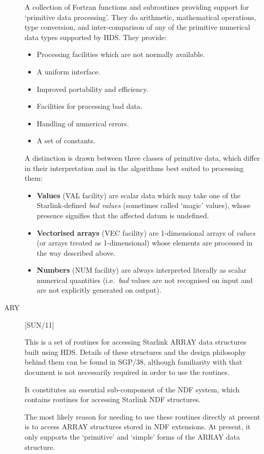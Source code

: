 \begin{description}
A collection of Fortran functions and subroutines providing support for
`primitive data processing'. 
They do arithmetic, mathematical operations, type conversion, and
inter-comparison of any of the primitive numerical data types supported by HDS.
They provide:
\begin{itemize}
\item Processing facilities which are not normally available.
\item A uniform interface.
\item Improved portability and efficiency.
\item Facilities for processing bad data.
\item Handling of numerical errors.
\item A set of constants.
\end{itemize}
A distinction is drawn between three classes of primitive data, which differ
in their interpretation and in the algorithms best suited to processing them: 
\begin{itemize}
\item {\bf Values} (VAL facility) are scalar data which may take one
of the Starlink-defined {\em bad values} (sometimes called `magic'
values), whose presence signifies that the affected datum is undefined. 
\item {\bf Vectorised arrays} (VEC facility) are 1-dimensional arrays
of {\em values} (or arrays treated as 1-dimensional) whose elements are
processed in the way described above. 
\item {\bf Numbers} (NUM facility) are always interpreted literally
as scalar numerical quantities (i.e.\ {\em bad} values are not recognised on
input and are not explicitly generated on output). 
\end{itemize}

\item [ARY] \hfill [SUN/11]

This is a set of routines for accessing Starlink ARRAY data structures built
using HDS.
Details of these structures and the design philosophy behind them can be
found in SGP/38, although familiarity with that document is not necessarily 
required in order to use the routines.

It constitutes an essential sub-component of the NDF system,
which contains routines for accessing Starlink NDF structures. 

The most likely reason for needing to use these routines directly at
present is to access ARRAY structures stored in NDF extensions.
At present, it only supports the `primitive' and `simple' forms of the
ARRAY data structure. 


\end{description}

